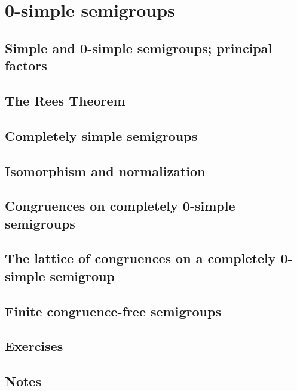 \section[3]{0-simple semigroups}

\subsection[1]{Simple and 0-simple semigroups; principal factors}
\subsection[2]{The Rees Theorem}
\subsection[3]{Completely simple semigroups}
\subsection[4]{Isomorphism and normalization}
\subsection[5]{Congruences on completely 0-simple semigroups}
\subsection[6]{The lattice of congruences on a completely 0-simple semigroup}
\subsection[7]{Finite congruence-free semigroups}
\subsection[8]{Exercises}
\subsection[9]{Notes}